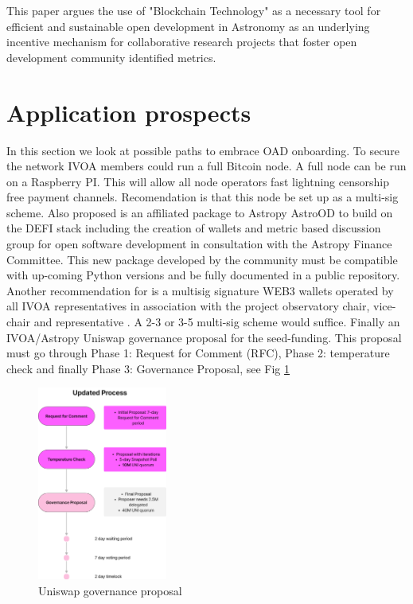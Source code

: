 \documentclass[final,5p,times,twocolumn,authoryear]{elsarticle}
\begin{document}
       
This paper argues the use of "Blockchain Technology" as a necessary tool for efficient and sustainable open development in Astronomy as an underlying incentive mechanism for collaborative research projects that foster open development community identified metrics.  


\section{Application prospects}
\label{sec:5}
%
In this section we look at possible paths to embrace OAD onboarding. To secure the network IVOA members could run a full Bitcoin node. A full node can be run on a Raspberry PI.  This will allow all node operators fast lightning censorship free payment channels. Recomendation is that this node be set up as a multi-sig scheme. Also proposed is an affiliated package to Astropy AstroOD to build on the DEFI stack including the creation of wallets and metric based discussion group for open software development in consultation with the Astropy Finance Committee. This new package developed by the community must be compatible with up-coming Python versions and be fully documented in a public repository. Another recommendation for is a multisig signature WEB3 wallets operated by all IVOA representatives in association with the project observatory chair, vice-chair and representative . A 2-3 or 3-5 multi-sig scheme would suffice. Finally an IVOA/Astropy Uniswap governance proposal for the seed-funding. This proposal must go through 
 Phase 1: Request for Comment (RFC), Phase 2: temperature check and finally Phase 3: Governance Proposal, see Fig \ref{fig:unigov}
%
\begin{figure}
    \centering
    \includegraphics[width=0.38\textwidth]{figs/unigov.png}
    \vspace*{-0.2cm}
    \caption{Uniswap governance proposal}
    \label{fig:unigov}
\end{figure}
\end{document}
